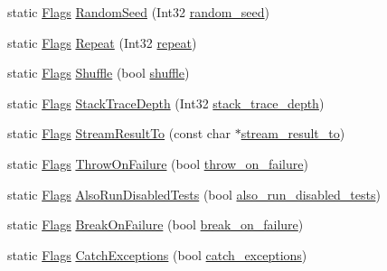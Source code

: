 \begin{DoxyCompactItemize}
\item 
static \mbox{\hyperlink{structtesting_1_1_flags}{Flags}} \mbox{\hyperlink{structtesting_1_1_flags_a695cd8b8ab44df5eaa371bacded78c05}{Random\+Seed}} (Int32 \mbox{\hyperlink{structtesting_1_1_flags_a4728bce63433f711205fd7b427e57f1b}{random\+\_\+seed}})
\item 
static \mbox{\hyperlink{structtesting_1_1_flags}{Flags}} \mbox{\hyperlink{structtesting_1_1_flags_a19d47e87d77a18ef4fa8a85b74e25956}{Repeat}} (Int32 \mbox{\hyperlink{structtesting_1_1_flags_a61614dd07f97f6e04d27c004ff15195e}{repeat}})
\item 
static \mbox{\hyperlink{structtesting_1_1_flags}{Flags}} \mbox{\hyperlink{structtesting_1_1_flags_a19ddbbaed61bda44a1940333b7c5a469}{Shuffle}} (bool \mbox{\hyperlink{structtesting_1_1_flags_a51c689e47e0f55c16116ac2a1d3b05d6}{shuffle}})
\item 
static \mbox{\hyperlink{structtesting_1_1_flags}{Flags}} \mbox{\hyperlink{structtesting_1_1_flags_a16b01d8bcceaa9fa8211fd24faa75b5a}{Stack\+Trace\+Depth}} (Int32 \mbox{\hyperlink{structtesting_1_1_flags_a20c6592453909c1adace64bf6a2bc2de}{stack\+\_\+trace\+\_\+depth}})
\item 
static \mbox{\hyperlink{structtesting_1_1_flags}{Flags}} \mbox{\hyperlink{structtesting_1_1_flags_a9cf0f64310b28eadbbfbb35584ebfc71}{Stream\+Result\+To}} (const char $\ast$\mbox{\hyperlink{structtesting_1_1_flags_a2adb495720379293f7e3fa0148482ac9}{stream\+\_\+result\+\_\+to}})
\item 
static \mbox{\hyperlink{structtesting_1_1_flags}{Flags}} \mbox{\hyperlink{structtesting_1_1_flags_ad856df862414ed0dadf80b5e03829cc7}{Throw\+On\+Failure}} (bool \mbox{\hyperlink{structtesting_1_1_flags_ab8e7d21e31e641efe47b8050759e001a}{throw\+\_\+on\+\_\+failure}})
\item 
static \mbox{\hyperlink{structtesting_1_1_flags}{Flags}} \mbox{\hyperlink{structtesting_1_1_flags_a8bee2b5f94d8248b6791d6b005db146f}{Also\+Run\+Disabled\+Tests}} (bool \mbox{\hyperlink{structtesting_1_1_flags_a8ebf8c68f918b9039926b569c880f910}{also\+\_\+run\+\_\+disabled\+\_\+tests}})
\item 
static \mbox{\hyperlink{structtesting_1_1_flags}{Flags}} \mbox{\hyperlink{structtesting_1_1_flags_a62660e44922321f7640bc951a04c2296}{Break\+On\+Failure}} (bool \mbox{\hyperlink{structtesting_1_1_flags_acccce2a9673bb61751269d2ef9c21c89}{break\+\_\+on\+\_\+failure}})
\item 
static \mbox{\hyperlink{structtesting_1_1_flags}{Flags}} \mbox{\hyperlink{structtesting_1_1_flags_a2c7d89f62f4328ae0ced66154ef96b44}{Catch\+Exceptions}} (bool \mbox{\hyperlink{structtesting_1_1_flags_a06984d0553f09716e1bd9f159e7cc644}{catch\+\_\+exceptions}})

\end{DoxyCompactItemize}
